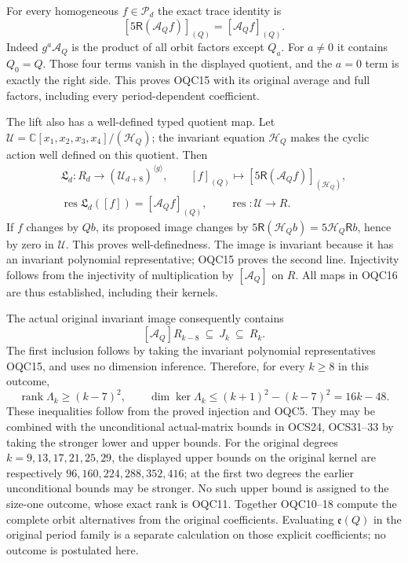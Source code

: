 \documentclass[11pt,a4paper]{article}
\begin{document}
For every homogeneous $f\in\mathscr P_d$ the exact trace identity is
\[
 \left[5\mathsf R(\mathcal A_Q f)\right]_{(Q)}
                          =[\mathcal A_Q f]_{(Q)}.
 \tag{OQC15}
\]
Indeed $g^a\mathcal A_Q$ is the product of all orbit factors
except $Q_a$. For $a\ne0$ it contains $Q_0=Q$. Those four
terms vanish in the displayed quotient, and the $a=0$ term is
exactly the right side. This proves OQC15 with its original
average and full factors, including every period-dependent
coefficient.

The lift also has a well-defined typed quotient map. Let
$\mathscr U=\mathbb C[x_1,x_2,x_3,x_4]/(\mathcal H_Q)$;
the invariant equation $\mathcal H_Q$ makes the cyclic action
well defined on this quotient. Then
\[
 \begin{gathered}
 \mathfrak L_d:R_d\longrightarrow
                      (\mathscr U_{d+8})^{\langle g\rangle},\qquad
 [f]_{(Q)}\longmapsto[5\mathsf R(\mathcal A_Q f)]_{(\mathcal H_Q)},\\
 \operatorname{res}\mathfrak L_d([f])=[\mathcal A_Q f]_{(Q)},
 \qquad \operatorname{res}:\mathscr U\to R.
 \end{gathered}\tag{OQC16}
\]
If $f$ changes by $Qb$, its proposed image changes by
$5\mathsf R(\mathcal H_Qb)=5\mathcal H_Q\mathsf Rb$, hence
by zero in $\mathscr U$. This proves well-definedness. The
image is invariant because it has an invariant polynomial
representative; OQC15 proves the second line. Injectivity follows
from the injectivity of multiplication by $[\mathcal A_Q]$ on
$R$. All maps in OQC16 are thus established, including their kernels.

The actual original invariant image consequently contains
\[
 [\mathcal A_Q]R_{k-8}\ \subseteq\ J_k\ \subseteq\ R_k.
 \tag{OQC17}
\]
The first inclusion follows by taking the invariant polynomial
representatives OQC15, and uses no dimension inference. Therefore,
for every $k\geq8$ in this outcome,
\[
 \operatorname{rank}\Lambda_k\geq(k-7)^2,\qquad
 \dim\ker\Lambda_k\leq(k+1)^2-(k-7)^2=16k-48.
 \tag{OQC18}
\]
These inequalities follow from the proved injection and OQC5.
They may be combined with the unconditional actual-matrix bounds
in OCS24, OCS31--33 by taking the stronger lower and upper bounds.
For the original degrees $k=9,13,17,21,25,29$, the displayed upper
bounds on the original kernel are respectively
$96,160,224,288,352,416$; at the first two degrees the earlier
unconditional bounds may be stronger. No such upper bound is
assigned to the size-one outcome, whose exact rank is OQC11.
Together OQC10--18 compute the complete orbit alternatives from
the original coefficients. Evaluating $\mathfrak e(Q)$ in the
original period family is a separate calculation on those explicit
coefficients; no outcome is postulated here.
\end{document}
